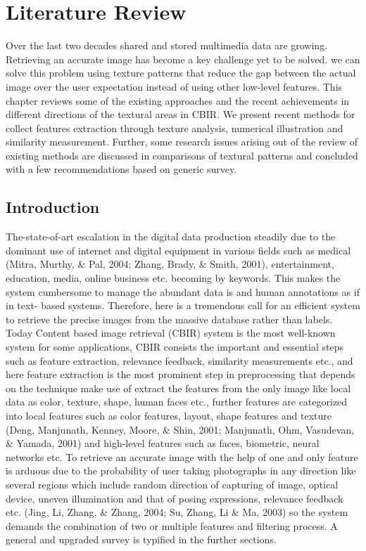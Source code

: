 \chapter{Literature Review}
\label{Chapter2:SLR}
Over the last two decades shared and stored multimedia data are growing. Retrieving an accurate image has become a key challenge yet to be solved. we can solve this problem using texture patterns that reduce the gap between the actual image over the user expectation instead of using other low-level features. This chapter reviews some of the existing approaches and the recent achievements in different directions  of the textural areas in CBIR. We present recent methods for   collect  features extraction through texture analysis, numerical illustration and similarity measurement. Further, some research issues arising out of the review of existing methods are discussed in comparisons of textural patterns and concluded with a few recommendations based on generic survey.


\section{Introduction}	
The-state-of-art escalation in the digital data production steadily due to the dominant use of internet and digital equipment in various fields such as medical (Mitra, Murthy, \& Pal, 2004; Zhang, Brady, \& Smith, 2001), entertainment, education, media, online business etc. becoming by keywords. This makes the system cumbersome to manage the abundant data is and human annotations as if in text- based systems. Therefore, here is a tremendous call for an efficient system to retrieve the precise images from the massive database rather than labels. Today Content based image retrieval (CBIR) system is the most well-known system for some applications, CBIR consists the important and essential steps such as feature extraction, relevance feedback, similarity measurements etc., and here feature extraction is the most prominent step in preprocessing that depends on the technique make use of extract the features from the only image like local data as color, texture, shape, human faces etc., further features are categorized into local features such as color features, layout, shape features and texture (Deng, Manjunath, Kenney, Moore, \& Shin, 2001; Manjunath, Ohm, Vasudevan, \& Yamada, 2001) and high-level features such as faces, biometric, neural networks etc. To retrieve an accurate image with the help of one and only feature is arduous due to the probability of user taking photographs in any direction like several regions which include random direction of capturing of image, optical device, uneven illumination and that of posing expressions, relevance feedback etc. (Jing, Li, Zhang, \& Zhang, 2004; Su, Zhang, Li \& Ma, 2003) so the system demands the combination of two or multiple features and filtering process. A general and upgraded survey is typified in the further sections.

